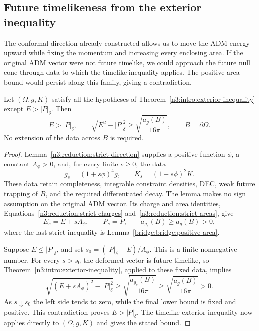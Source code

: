 \subsection{Future timelikeness from the exterior inequality}
\label{bridge:bridge:section}

The conformal direction already constructed allows us to move the ADM
energy upward while fixing the momentum and increasing every enclosing
area. If the original ADM vector were not future timelike, we could
approach the future null cone through data to which the timelike
inequality applies. The positive area bound would persist along this
family, giving a contradiction.

\begin{theorem}
\label{bridge:bridge:timelike}\label{thm:weak3}
Let $(\Omega,g,K)$ satisfy all the hypotheses of
Theorem~\ref{n3:intro:exterior-inequality} except $E>|P|_\delta$.
Then
\[
 E>|P|_\delta,\qquad
 \sqrt{E^2-|P|_\delta^2}\ge
                  \sqrt{\frac{a_g(B)}{16\pi}},\qquad B=\partial \Omega.
\]
No extension of the data across $B$ is required.
\end{theorem}

\begin{proof}
Lemma~\ref{n3:reduction:strict-direction} supplies a positive function
$\phi$, a constant $A_\phi>0$, and, for every finite $s\ge0$, the data
\[
       g_s=(1+s\phi)^4g,\qquad K_s=(1+s\phi)^2K.
\]
These data retain completeness, integrable constraint densities, DEC,
weak future trapping of $B$, and the required differentiated decay.
The lemma makes no sign assumption on the original ADM vector. Its
charge and area identities, Equations~\eqref{n3:reduction:strict-charges}
and~\eqref{n3:reduction:strict-areas}, give
\[
       E_s=E+sA_\phi,\qquad P_s=P,\qquad
       a_{g_s}(B)\ge a_g(B)>0,
\]
where the last strict inequality is
Lemma~\ref{bridge:bridge:positive-area}.

Suppose $E\le|P|_\delta$, and set
$s_0=(|P|_\delta-E)/A_\phi$. This is a finite nonnegative number.
For every $s>s_0$ the deformed vector is future timelike, so
Theorem~\ref{n3:intro:exterior-inequality}, applied to these fixed data,
implies
\[
 \sqrt{(E+sA_\phi)^2-|P|_\delta^2}
       \ge\sqrt{\frac{a_{g_s}(B)}{16\pi}}
       \ge\sqrt{\frac{a_g(B)}{16\pi}}>0.
\]
As $s\downarrow s_0$ the left side tends to zero, while the final
lower bound is fixed and positive. This contradiction proves
$E>|P|_\delta$. The timelike exterior inequality now applies directly
to $(\Omega,g,K)$ and gives the stated bound.
\end{proof}

